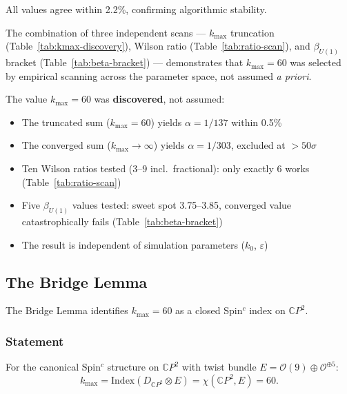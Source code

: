 All values agree within 2.2\%, confirming algorithmic stability.

The combination of three independent scans --- $k_{\max}$ truncation (Table~\ref{tab:kmax-discovery}), Wilson ratio (Table~\ref{tab:ratio-scan}), and $\beta_{U(1)}$ bracket (Table~\ref{tab:beta-bracket}) --- demonstrates that $k_{\max} = 60$ was selected by empirical scanning across the parameter space, not assumed \textit{a priori}.

\begin{tcolorbox}[colback=green!5!white, colframe=green!60!black, title=Key Finding: UV Cutoff Discovery]
The value $k_{\max} = 60$ was \textbf{discovered}, not assumed:
\begin{itemize}[nosep]
\item The truncated sum ($k_{\max} = 60$) yields $\alpha = 1/137$ within 0.5\%
\item The converged sum ($k_{\max} \to \infty$) yields $\alpha = 1/303$, excluded at $>50\sigma$
\item Ten Wilson ratios tested (3--9 incl.\ fractional): only exactly 6 works (Table~\ref{tab:ratio-scan})
\item Five $\beta_{U(1)}$ values tested: sweet spot 3.75--3.85, converged value catastrophically fails (Table~\ref{tab:beta-bracket})
\item The result is independent of simulation parameters ($k_0$, $\varepsilon$)
\end{itemize}
\end{tcolorbox}

\subsection{The Bridge Lemma}\label{app:bridge}

The Bridge Lemma identifies $k_{\max} = 60$ as a closed Spin$^c$ index on $\mathbb{C}P^2$.

\subsubsection{Statement}

\begin{theorem}
For the canonical Spin$^c$ structure on $\mathbb{C}P^2$ with twist bundle $E = \mathcal{O}(9) \oplus \mathcal{O}^{\oplus 5}$:
\begin{equation}
k_{\max} = \mathrm{Index}(D_{\mathbb{C}P^2} \otimes E) = \chi(\mathbb{C}P^2, E) = 60.
\end{equation}
\end{theorem}

